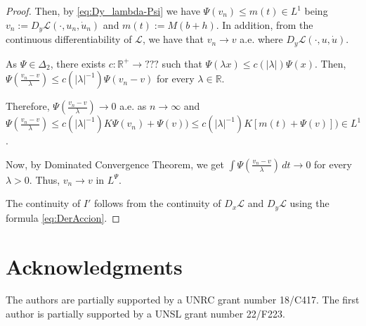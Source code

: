 \documentclass[twoside]{article}
\theoremstyle{remark}
\newcommand{\rr}{\mathbb{R}}
\renewcommand{\leq}{\leqslant}
\begin{document}
\begin{proof}
Then, by \eqref{eq:Dy_lambda-Psi} we have
 $ \Psi(v_n) 
	\leq m(t) \in L^1$
 being  $v_n:=D_{y}\mathcal{L}(\cdot,u_n,\dot{u}_n)$ and $m(t):= M (b+h)$. 
In addition, from the continuous differentiability of $\mathcal{L}$, we have that
$v_n \to v$ a.e. where $D_y\mathcal{L}(\cdot,u,\dot{u})$.

As  $\Psi\in\Delta_2$, there exists $c:\rr^+\to ???$ such that 
$\Psi(\lambda x)\leq c(|\lambda|)\Psi(x)$. 
Then, $\Psi(\frac{v_n-v}{\lambda})\leq c(|\lambda|^{-1})\Psi(v_n-v)$ for every $\lambda \in \rr$.

Therefore, $\Psi(\frac{v_n-v}{\lambda})\to 0$ a.e. as $n \to \infty$ and 
$\Psi(\frac{v_n-v}{\lambda})\leq c(|\lambda|^{-1})K\Psi(v_n)+\Psi(v))
\leq c(|\lambda|^{-1}) K [m(t)+\Psi(v)])\in L^1$.

Now, by Dominated Convergence Theorem, we get
$
\int \Psi(\frac{v_n-v}{\lambda})\,dt \to 0
$
for every $\lambda>0$. Thus, $v_n \to v$ in $L^{\Psi}$.

The continuity of $I'$  follows  from the continuity 
of $D_{x}\mathcal{L}$ and $D_{y}\mathcal{L}$ using the formula \eqref{eq:DerAccion}.
\end{proof}







\section*{Acknowledgments}
The authors are partially supported by a UNRC grant number 18/C417. The first author is  partially supported by a  UNSL grant number 22/F223. 




 
 
\end{document}
